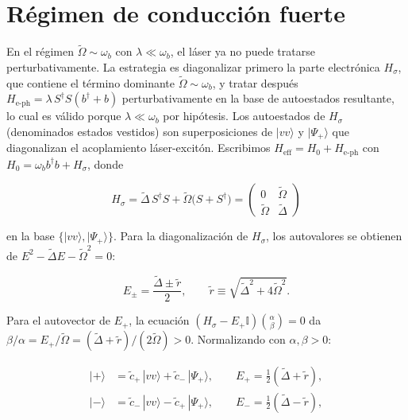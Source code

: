 \section{Régimen de conducción fuerte}\label{reg3}

En el régimen $\widetilde\Omega \sim \omega_b$ con $\lambda \ll \omega_b$, el láser ya no puede tratarse perturbativamente. La estrategia es diagonalizar primero la parte electrónica $H_\sigma$, que contiene el término dominante $\widetilde\Omega \sim \omega_b$, y tratar después $H_\mathrm{e\text{-}ph} = \lambda\,S^\dagger S(b^\dagger+b)$ perturbativamente en la base de autoestados resultante, lo cual es válido porque $\lambda \ll \omega_b$ por hipótesis. Los autoestados de $H_\sigma$ (denominados estados vestidos) son superposiciones de $|vv\rangle$ y $|\Psi_+\rangle$ que diagonalizan el acoplamiento láser-excitón. Escribimos $H_\mathrm{eff} = H_0 + H_\mathrm{e\text{-}ph}$ con $H_0 = \omega_b b^\dagger b + H_\sigma$, donde

\begin{equation}
	H_\sigma = \widetilde\Delta\,S^\dagger S
	+ \widetilde\Omega\bigl(S + S^\dagger\bigr)
	= \begin{pmatrix} 0 & \widetilde\Omega \\[2pt]
		\widetilde\Omega & \widetilde\Delta \end{pmatrix}
	\label{eq:Hsigma}
\end{equation}

en la base $\{|vv\rangle,|\Psi_+\rangle\}$. Para la diagonalización de $H_\sigma$, los autovalores se obtienen de
$E^2 - \widetilde\Delta E - \widetilde\Omega^2 = 0$:

\begin{equation}
	E_\pm = \frac{\widetilde\Delta \pm \tilde{r}}{2},
	\qquad
	\tilde{r} \equiv \sqrt{\widetilde\Delta^2 + 4\widetilde\Omega^2}.
	\label{eq:autovalores}
\end{equation}

Para el autovector de $E_+$, la ecuación $(H_\sigma - E_+\mathbb{I})\binom{\alpha}{\beta} = 0$ da $\beta/\alpha = E_+/\widetilde\Omega = (\widetilde\Delta + \tilde{r})/(2\widetilde\Omega) > 0$. Normalizando con $\alpha,\beta > 0$:

\begin{align}
	|{+}\rangle &= \tilde{c}_+\,|vv\rangle + \tilde{c}_-\,|\Psi_+\rangle,
	\qquad E_+ = \tfrac{1}{2}(\widetilde\Delta + \tilde{r}),
	\label{eq:ket_p}\\[4pt]
	|{-}\rangle &= \tilde{c}_-\,|vv\rangle - \tilde{c}_+\,|\Psi_+\rangle,
	\qquad E_- = \tfrac{1}{2}(\widetilde\Delta - \tilde{r}),
	\label{eq:ket_m}
\end{align}

